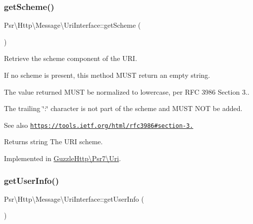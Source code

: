 \subsubsection{\texorpdfstring{get\+Scheme()}{getScheme()}}
{\footnotesize\ttfamily Psr\textbackslash{}\+Http\textbackslash{}\+Message\textbackslash{}\+Uri\+Interface\+::get\+Scheme (\begin{DoxyParamCaption}{ }\end{DoxyParamCaption})}

Retrieve the scheme component of the U\+RI.

If no scheme is present, this method M\+U\+ST return an empty string.

The value returned M\+U\+ST be normalized to lowercase, per R\+FC 3986 Section 3..

The trailing \char`\"{}\+:\char`\"{} character is not part of the scheme and M\+U\+ST N\+OT be added.

\begin{DoxySeeAlso}{See also}
\href{https://tools.ietf.org/html/rfc3986#section-3.1}{\tt https\+://tools.\+ietf.\+org/html/rfc3986\#section-\/3.} 
\end{DoxySeeAlso}
\begin{DoxyReturn}{Returns}
string The U\+RI scheme. 
\end{DoxyReturn}


Implemented in \hyperlink{classGuzzleHttp_1_1Psr7_1_1Uri_a3357bfcc071b00cecace2fa086bea14a}{Guzzle\+Http\textbackslash{}\+Psr7\textbackslash{}\+Uri}.

\mbox{\label{interfacePsr_1_1Http_1_1Message_1_1UriInterface_aa19d2f6ab55d87aa607bfca6995f9923}} 
\subsubsection{\texorpdfstring{get\+User\+Info()}{getUserInfo()}}
{\footnotesize\ttfamily Psr\textbackslash{}\+Http\textbackslash{}\+Message\textbackslash{}\+Uri\+Interface\+::get\+User\+Info (\begin{DoxyParamCaption}{ }\end{DoxyParamCaption})}

